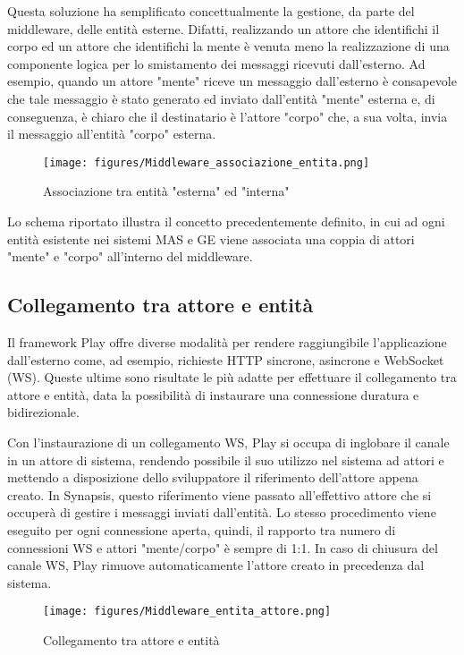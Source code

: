 \medskip

Questa soluzione ha semplificato concettualmente la gestione, da parte del middleware, delle entità esterne. Difatti, realizzando un attore che identifichi il corpo ed un attore che identifichi la mente è venuta meno la realizzazione di una componente logica per lo smistamento dei messaggi ricevuti dall'esterno. Ad esempio, quando un attore "mente" riceve un messaggio dall'esterno è consapevole che tale messaggio è stato generato ed inviato dall'entità "mente" esterna e, di conseguenza, è chiaro che il destinatario è l'attore "corpo" che, a sua volta, invia il messaggio all'entità "corpo" esterna.

\begin{figure}[H]
\centering
\texttt{[image: figures/Middleware\_associazione\_entita.png]}
\caption{Associazione tra entità "esterna" ed "interna"}
\end{figure}

Lo schema riportato illustra il concetto precedentemente definito, in cui ad ogni entità esistente nei sistemi MAS e GE viene associata una coppia di attori "mente" e "corpo" all'interno del middleware.

\subsection{Collegamento tra attore e entità}

Il framework Play offre diverse modalità per rendere raggiungibile l'applicazione dall'esterno come, ad esempio, richieste HTTP sincrone, asincrone e WebSocket (WS). Queste ultime sono risultate le più adatte per effettuare il collegamento tra attore e entità, data la possibilità di instaurare una connessione duratura e bidirezionale.

\medskip

Con l'instaurazione di un collegamento WS, Play si occupa di inglobare il canale in un attore di sistema, rendendo possibile il suo utilizzo nel sistema ad attori e mettendo a disposizione dello sviluppatore il riferimento dell'attore appena creato. 
\smallskip
In Synapsis, questo riferimento viene passato all'effettivo attore che si occuperà di gestire i messaggi inviati dall'entità. Lo stesso procedimento viene eseguito per ogni connessione aperta, quindi, il rapporto tra numero di connessioni WS e attori "mente/corpo" è sempre di 1:1.  In caso di chiusura del canale WS, Play rimuove automaticamente l'attore creato in precedenza dal sistema.
\begin{figure}[H]
\centering
\texttt{[image: figures/Middleware\_entita\_attore.png]}
\caption{Collegamento tra attore e entità}
\end{figure}

